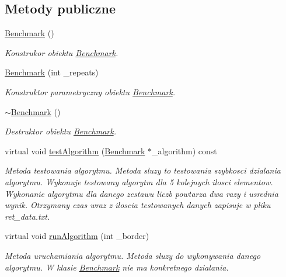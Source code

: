 \subsection*{Metody publiczne}
\begin{DoxyCompactItemize}
\item 
\hyperlink{class_benchmark_acfca497989836a688d44477802e822d8}{Benchmark} ()
\begin{DoxyCompactList}\small\item\em Konstrukor obiektu \hyperlink{class_benchmark}{Benchmark}. \end{DoxyCompactList}\item 
\hyperlink{class_benchmark_a4ee5bf5b4d120ee7a99f585d709a70e9}{Benchmark} (int \-\_\-repeats)
\begin{DoxyCompactList}\small\item\em Konstruktor parametryczny obiektu \hyperlink{class_benchmark}{Benchmark}. \end{DoxyCompactList}\item 
\hyperlink{class_benchmark_a20476e07f09e2b20ed3e9a7f13a570e6}{$\sim$\-Benchmark} ()
\begin{DoxyCompactList}\small\item\em Destruktor obiektu \hyperlink{class_benchmark}{Benchmark}. \end{DoxyCompactList}\item 
virtual void \hyperlink{class_benchmark_aced3a227d5a25b5cbceaa529214c0019}{test\-Algorithm} (\hyperlink{class_benchmark}{Benchmark} $\ast$\-\_\-algorithm) const 
\begin{DoxyCompactList}\small\item\em Metoda testowania algorytmu. Metoda sluzy to testowania szybkosci dzialania algorytmu. Wykonuje testowany algorytm dla 5 kolejnych ilosci elementow. Wykonanie algorytmu dla danego zestawu liczb powtarza dwa razy i usrednia wynik. Otrzymany czas wraz z iloscia testowanych danych zapisuje w pliku ret\-\_\-data.\-txt. \end{DoxyCompactList}\item 
virtual void \hyperlink{class_benchmark_a6363894c058e8bfe146de09d7126b29c}{run\-Algorithm} (int \-\_\-border)
\begin{DoxyCompactList}\small\item\em Metoda uruchamiania algorytmu. Metoda sluzy do wykonywania danego algorytmu. W klasie \hyperlink{class_benchmark}{Benchmark} nie ma konkretnego dzialania. \end{DoxyCompactList}\end{DoxyCompactItemize}

